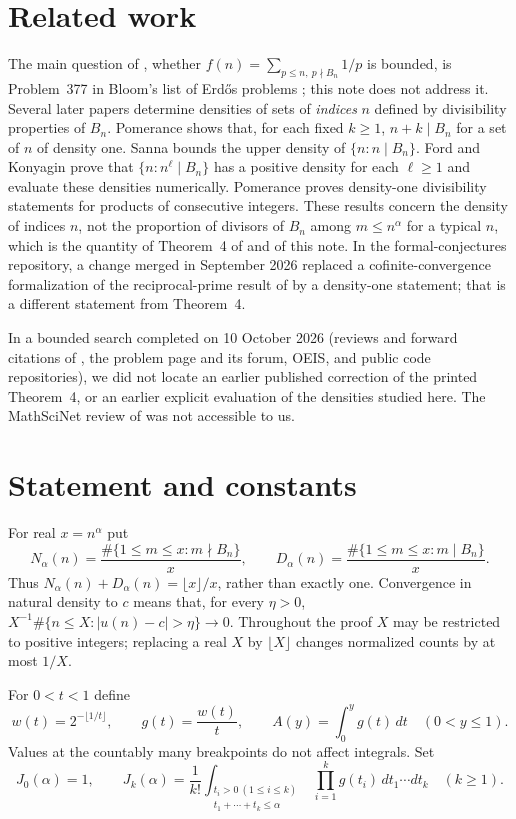 \documentclass[10pt]{article}
\theoremstyle{remark}
\begin{document}
\section{Related work}
The main question of \cite{EGRS}, whether
$f(n)=\sum_{p\leq n,\ p\nmid B_n}1/p$ is bounded, is Problem~377 in
Bloom's list of Erd\H{o}s problems \cite{EP377}; this note does not
address it. Several later papers determine densities of sets of
\emph{indices} $n$ defined by divisibility properties of $B_n$.
Pomerance \cite{Po15} shows that, for each fixed $k\geq1$, $n+k\mid B_n$
for a set of $n$ of density one. Sanna \cite{Sa18} bounds the upper
density of $\{n:n\mid B_n\}$. Ford and Konyagin \cite{FK21} prove that
$\{n:n^\ell\mid B_n\}$ has a positive density for each $\ell\geq1$ and
evaluate these densities numerically. Pomerance \cite{Po26} proves
density-one divisibility statements for products of consecutive
integers. These results concern the density of indices $n$, not the
proportion of divisors of $B_n$ among $m\leq n^\alpha$ for a typical
$n$, which is the quantity of Theorem~4 of \cite{EGRS} and of this note.
In the formal-conjectures repository, a change merged in September 2026
\cite{FC5792} replaced a cofinite-convergence formalization of the
reciprocal-prime result of \cite{EGRS} by a density-one statement; that
is a different statement from Theorem~4.

In a bounded search completed on 10 October 2026 (reviews and forward
citations of \cite{EGRS}, the problem page and its forum, OEIS, and
public code repositories), we did not locate an earlier published
correction of the printed Theorem~4, or an earlier explicit evaluation
of the densities studied here. The MathSciNet review of \cite{EGRS} was
not accessible to us.

\section{Statement and constants}\label{sec:statement}
For real $x=n^\alpha$ put
\[
 N_\alpha(n)=\frac{\#\{1\leq m\leq x:m\nmid B_n\}}x,
 \qquad
 D_\alpha(n)=\frac{\#\{1\leq m\leq x:m\mid B_n\}}x.
\]
Thus $N_\alpha(n)+D_\alpha(n)=\lfloor x\rfloor/x$, rather than exactly
one. Convergence in natural density to $c$ means that, for every $\eta>0$,
$X^{-1}\#\{n\leq X:|u(n)-c|>\eta\}\to0$. Throughout the proof $X$ may
be restricted to positive integers; replacing a real $X$ by $\lfloor
X\rfloor$ changes normalized counts by at most $1/X$.

For $0<t<1$ define
\[
 w(t)=2^{-\lfloor1/t\rfloor},\qquad g(t)=\frac{w(t)}t,
 \qquad A(y)=\int_0^y g(t)\,dt\quad(0<y\leq1).
\]
Values at the countably many breakpoints do not affect integrals. Set
\[
 J_0(\alpha)=1,\qquad
 J_k(\alpha)=\frac1{k!}
 \int_{\substack{t_i>0\ (1\leq i\leq k)\\t_1+\cdots+t_k\leq\alpha}}
       \prod_{i=1}^k g(t_i)\,dt_1\cdots dt_k\quad(k\geq1).
\]
\end{document}
